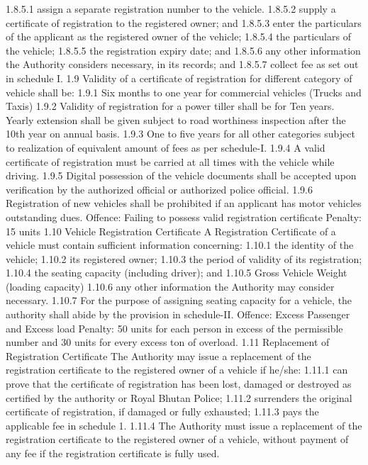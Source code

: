 \documentclass[
]{book}
\begin{document}
1.8.5.1 assign a separate registration number to the vehicle.
1.8.5.2 supply a certificate of registration to the registered owner; and
1.8.5.3 enter the particulars of the applicant as the registered owner of the vehicle;
1.8.5.4 the particulars of the vehicle;
1.8.5.5 the registration expiry date; and
1.8.5.6 any other information the Authority considers necessary, in its records; and
1.8.5.7 collect fee as set out in schedule I.
1.9 Validity of a certificate of registration for different category of vehicle shall be:
1.9.1 Six months to one year for commercial vehicles (Trucks and Taxis)
1.9.2 Validity of registration for a power tiller shall be for Ten years. Yearly extension shall be given subject to road worthiness inspection after the 10th year on annual basis.
1.9.3 One to five years for all other categories subject to realization of equivalent amount of fees as per schedule-I.
1.9.4 A valid certificate of registration must be carried at all times with the vehicle while driving.
1.9.5 Digital possession of the vehicle documents shall be accepted upon verification by the authorized official or authorized police official.
1.9.6 Registration of new vehicles shall be prohibited if an applicant has motor vehicles outstanding dues.
Offence: Failing to possess valid registration certificate
Penalty: 15 units
1.10 Vehicle Registration Certificate
A Registration Certificate of a vehicle must contain sufficient information concerning:
1.10.1 the identity of the vehicle;
1.10.2 its registered owner;
1.10.3 the period of validity of its registration;
1.10.4 the seating capacity (including driver); and
1.10.5 Gross Vehicle Weight (loading capacity)
1.10.6 any other information the Authority may consider necessary.
1.10.7 For the purpose of assigning seating capacity for a vehicle, the authority shall abide by the provision in schedule-II.
Offence: Excess Passenger and Excess load
Penalty: 50 units for each person in excess of the permissible number and 30 units for every excess ton of overload.
1.11 Replacement of Registration Certificate
The Authority may issue a replacement of the registration certificate to the registered owner of a vehicle if he/she:
1.11.1 can prove that the certificate of registration has been lost, damaged or destroyed as certified by the authority or Royal Bhutan Police;
1.11.2 surrenders the original certificate of registration, if damaged or fully exhausted;
1.11.3 pays the applicable fee in schedule 1.
1.11.4 The Authority must issue a replacement of the registration certificate to the registered owner of a vehicle, without payment of any fee if the registration certificate is fully used.
\end{document}
